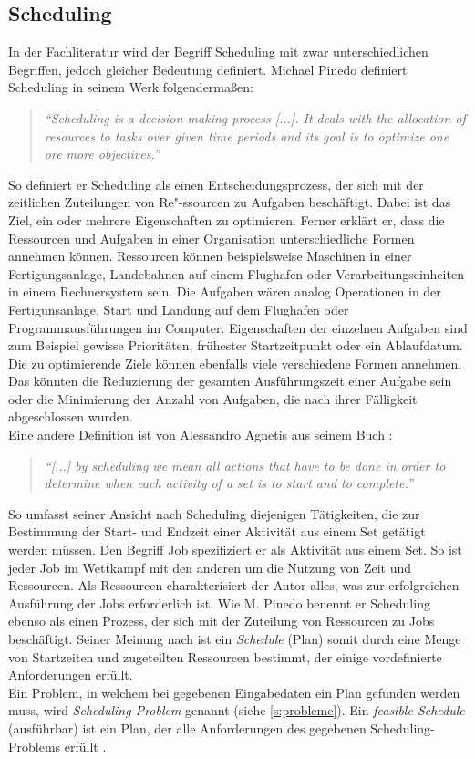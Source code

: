 \subsection{Scheduling}\label{s:scheduling}
In der Fachliteratur wird der Begriff Scheduling mit zwar unterschiedlichen Begriffen, jedoch gleicher Bedeutung definiert. Michael Pinedo definiert Scheduling in seinem Werk \cite{mpinedo} folgendermaßen:
\begin{quote}
\textit{"`Scheduling is a decision-making process [...]. It deals with the allocation of resources to tasks over given time periods and its goal is to optimize one ore more objectives."'}
\end{quote}
So definiert er Scheduling als einen Entscheidungsprozess, der sich mit der zeitlichen Zuteilungen von Re"-ssourcen zu Aufgaben beschäftigt. Dabei ist das Ziel, ein oder mehrere Eigenschaften zu optimieren. Ferner erklärt er, dass die Ressourcen und Aufgaben in einer Organisation unterschiedliche Formen annehmen können. Ressourcen können beispielsweise Maschinen in einer Fertigungsanlage, Landebahnen auf einem Flughafen oder Verarbeitungseinheiten in einem Rechnersystem sein. Die Aufgaben wären analog Operationen in der Fertigunsanlage, Start und Landung auf dem Flughafen oder Programmausführungen im Computer. Eigenschaften der einzelnen Aufgaben sind zum Beispiel gewisse Prioritäten, frühester Startzeitpunkt oder ein Ablaufdatum. Die zu optimierende Ziele können ebenfalls viele verschiedene Formen annehmen. Das könnten die Reduzierung der gesamten Ausführungszeit einer Aufgabe sein oder die Minimierung der Anzahl von Aufgaben, die nach ihrer Fälligkeit abgeschlossen wurden.\\

Eine andere Definition ist von Alessandro Agnetis aus seinem Buch \cite{aagnetis}:
\begin{quote}
\textit{"`[...] by scheduling we mean all actions that have to be done in order to determine when each activity of a set is to start and to complete."'}
\end{quote}
So umfasst seiner Ansicht nach Scheduling diejenigen Tätigkeiten, die zur Bestimmung der Start- und Endzeit einer Aktivität aus einem Set getätigt werden müssen. Den Begriff Job spezifiziert er als Aktivität aus einem Set. So ist jeder Job im Wettkampf mit den anderen um die Nutzung von Zeit und Ressourcen. Als Ressourcen charakterisiert der Autor alles, was zur erfolgreichen Ausführung der Jobs erforderlich ist. Wie M. Pinedo benennt er Scheduling ebenso als einen Prozess, der sich mit der Zuteilung von Ressourcen zu Jobs beschäftigt. Seiner Meinung nach ist ein \textit{Schedule} (Plan) somit durch eine Menge von Startzeiten und zugeteilten Ressourcen bestimmt, der einige vordefinierte Anforderungen erfüllt.\\
Ein Problem, in welchem bei gegebenen Eingabedaten ein Plan gefunden werden muss, wird \textit{Scheduling-Problem} genannt (siehe \ref{s:probleme}). Ein \textit{feasible Schedule} (ausführbar) ist ein Plan, der alle Anforderungen des gegebenen Scheduling-Problems erfüllt \cite{aagnetis}.\\

